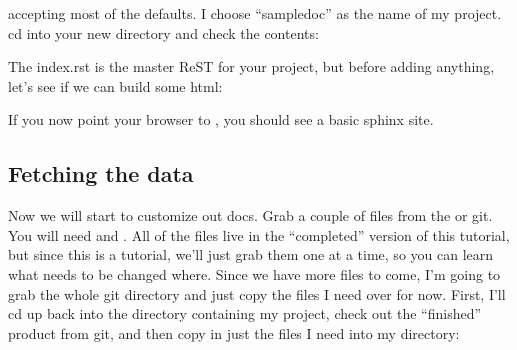 \documentclass[letterpaper,10pt,english]{sphinxmanual}
\begin{document}
\sphinxAtStartPar
accepting most of the defaults.  I choose “sampledoc” as the name of my
project.  cd into your new directory and check the contents:

\begin{sphinxVerbatim}[commandchars=\\\{\}]
 
               
               
\end{sphinxVerbatim}

\sphinxAtStartPar
The index.rst is the master ReST for your project, but before adding
anything, let’s see if we can build some html:

\begin{sphinxVerbatim}[commandchars=\\\{\}]
 
\end{sphinxVerbatim}

\sphinxAtStartPar
If you now point your browser to , you
should see a basic sphinx site.

\noindent{}


\subsection{Fetching the data}
\label{\detokenize{chapter1:fetching-the-data}}\label{\detokenize{chapter1:id2}}
\sphinxAtStartPar
Now we will start to customize out docs.  Grab a couple of files from
the 
or git.  You will need  and
.  All of the files live in the
“completed” version of this tutorial, but since this is a tutorial,
we’ll just grab them one at a time, so you can learn what needs to be
changed where.  Since we have more files to come, I’m going to grab
the whole git directory and just copy the files I need over for now.
First, I’ll cd up back into the directory containing my project, check
out the “finished” product from git, and then copy in just the files I
need into my  directory:
\end{document}
